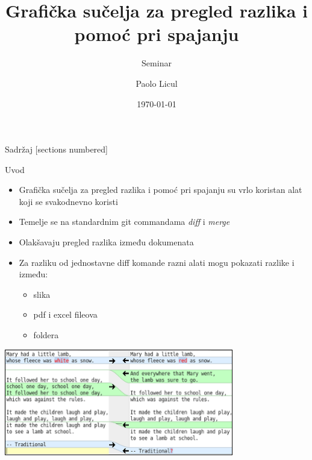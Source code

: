 \documentclass[10pt]{beamer}
\title{Grafička sučelja za pregled razlika i pomoć pri spajanju}
\subtitle{Seminar}
\date{\today}
\author{Paolo Licul}{Nino Dumičić}
\begin{document}
\maketitle

\begin{frame}{Sadržaj}
  [sections numbered]
  \tableofcontents[hideallsubsections]
\end{frame}


\begin{frame}{Uvod}
	\begin{itemize}
		\item Grafička sučelja za pregled razlika i pomoć pri spajanju su vrlo koristan alat koji se svakodnevno koristi
		\item Temelje se na standardnim git commandama \emph{diff} i \emph{merge}
		\item Olakšavaju pregled razlika između dokumenata
		\item Za razliku od jednostavne diff komande razni alati mogu pokazati razlike i između: \begin{itemize}
		\item slika
		\item pdf i excel fileova
		\item foldera
		\end{itemize}
	\end{itemize} 
	
\includegraphics[width=10cm]{gui.png}
\end{frame}
\end{document}
